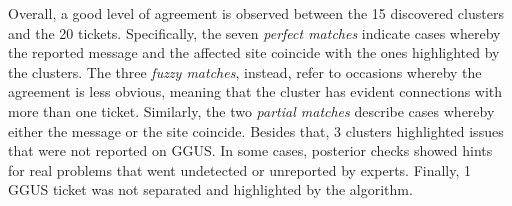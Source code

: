 Overall, a good level of agreement is observed between the 15 discovered clusters and the 20 tickets.
Specifically, the seven \textit{perfect matches} indicate cases whereby the reported message and the affected site coincide with the ones highlighted by the clusters.
The three \textit{fuzzy matches}, instead, refer to occasions whereby the agreement is less obvious, meaning that the cluster has evident connections with more than one ticket.
Similarly, the two \textit{partial matches} describe cases whereby either the message or the site coincide. 
Besides that, 3 clusters highlighted issues that were not reported on GGUS.
In some cases, posterior checks showed hints for real problems that went undetected or unreported by experts. 
Finally, 1 GGUS ticket was not separated and highlighted by the algorithm. 